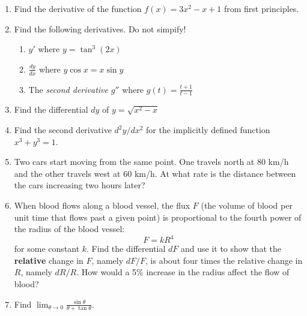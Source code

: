 \documentclass[12pt]{article}
\newcommand{\ds}{\displaystyle}
\begin{document}
\begin{enumerate}
\item Find
  the derivative of the function $f(x)=3x^2-x+1$ from first principles.
\vfill
\newpage
\item Find the following derivatives.  Do not simpify!
  \begin{enumerate}
  \item $\ds y'$
    where 
    $\ds y = \tan^3 (2x)$
\vfill
  \item $\ds\frac{dy}{dx}$
    where
    $\ds y\cos x = x\sin y$
\vfill
  \item The \emph{second derivative} $\ds g''$
    where 
    $\ds g(t)=\frac{t+1}{t-1}$
\vfill
  \end{enumerate}
\newpage
\item Find
  the differential $dy$ of $\ds y=\sqrt{x^2-x}$
\vfill
\item Find 
  the second derivative $d^2y/dx^2$ for the implicitly defined function 
  $\ds x^3+y^3=1$.
\vfill
\newpage
\item Two 
  cars start moving from the same point.  One travels 
  north at $80$ km/h and the other travels west at $60$ km/h.
  At what rate is the distance between the cars increasing two hours later?
\vfill
\newpage
\item When 
  blood flows along a blood vessel, the flux $F$ (the volume of blood per
  unit time that flows past a given point) is proportional to the fourth
  power of the radius of the blood vessel:
  \begin{equation*}
    F = k R^4
  \end{equation*}
  for some constant $k$.  Find the differential $dF$ and 
  use it to show that the \textbf{relative}
  change in $F$, namely $dF/F$,
  is about four times the relative change in $R$, namely $dR/R$.  How would
  a 5\% increase in the radius affect the flow of blood?
\newpage
\item Find 
  $\ds \lim_{\theta\to 0} \frac{\sin\theta}{\theta+\tan\theta}$.  
\vfill
\end{enumerate}
\end{document}
